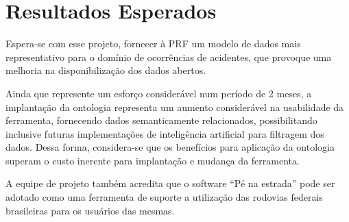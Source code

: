 \section{Resultados Esperados}

  Espera-se com esse projeto, fornecer à PRF um modelo de dados mais representativo
  para o domínio de ocorrências de acidentes, que provoque uma melhoria na
  disponibilização dos dados abertos.

  Ainda que represente um esforço considerável num período de 2 meses, a implantação da ontologia representa um aumento considerável na usabilidade da ferramenta, fornecendo dados semanticamente relacionados, possibilitando inclusive futuras implementações de inteligência artificial para filtragem dos dados. Dessa forma, considera-se que os benefícios para aplicação da ontologia superam o custo inerente para implantação e mudança da ferramenta. 

  A equipe de projeto também acredita que o software “Pé na estrada” pode ser adotado como uma ferramenta de suporte a utilização das rodovias federais brasileiras para os usuários das mesmas.